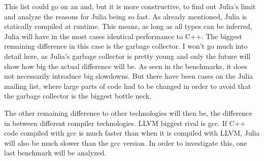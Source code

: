 This list could go on an and, but it is more constructive, to find out Julia's limit and analyze the reasons for Julia being so fast.
As already mentioned, Julia is statically compiled at runtime. This means, as long as all types can be inferred, Julia will have in the most cases identical performance to C++.
The biggest remaining difference in this case is the garbage collector. I won't go much into detail here, as Julia's garbage collector is pretty young and only the future will show how big the actual difference will be. As seen in the benchmarks, it does not necessarily introduce big slowdowns. But there have been cases on the Julia mailing list, where large parts of code had to be changed in order to avoid that the garbage collector is the biggest bottle neck.

The other remaining difference to other technologies will then be, the difference in between different compiler technologies.
\ac{LLVM} biggest rival is \ac{gcc}. If C++ code compiled with \ac{gcc} is much faster than when it is compiled with \ac{LLVM}, Julia will also be much slower than the \ac{gcc} version.
In order to investigate this, one last benchmark will be analyzed.

